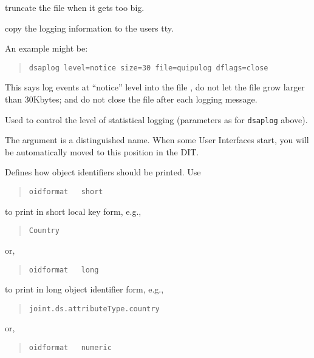 \begin{describe}
\begin{describe}
\begin{describe}
\item [\verb"zero":]
truncate the file when it gets too big.
\item [\verb"tty":]
copy the logging information to the users tty.
\end{describe}
\end{describe}
An example might be:
\begin{quote}\footnotesize\begin{verbatim}
dsaplog level=notice size=30 file=quipulog dflags=close
\end{verbatim}\end{quote}
This says log events at ``notice'' level into the file , do not
let the file grow larger than 30Kbytes; and do not close the file
after each logging message.

\item [\verb"stats":] Used to control the level of statistical logging
(parameters as for \verb+dsaplog+ above).

\item [\verb"local\_DIT":]
The argument is a distinguished name.  When some User Interfaces start, you
will be automatically moved to this position in the DIT.

\item [\verb"oidformat":]
Defines how object identifiers should be printed.
Use
\begin{quote}\small\begin{verbatim}
oidformat   short
\end{verbatim}\end{quote}

to print in short local key form, e.g.,
\begin{quote}\small\begin{verbatim}
Country
\end{verbatim}\end{quote}
or,
\begin{quote}\small\begin{verbatim}
oidformat   long
\end{verbatim}\end{quote}

to print in long object identifier form, e.g.,
\begin{quote}\small\begin{verbatim}
joint.ds.attributeType.country
\end{verbatim}\end{quote}
or,
\begin{quote}\small\begin{verbatim}
oidformat   numeric
\end{verbatim}\end{quote}


\end{describe}
